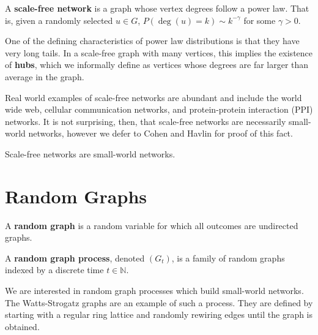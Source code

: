 
\begin{definition}
  A \textbf{scale-free network} is a graph whose vertex degrees follow a power
  law. That is, given a randomly selected $u \in G$,
  $P(\deg(u) = k) \sim k^{-\gamma}$ for some $\gamma > 0$.
\end{definition}

One of the defining characteristics of power law distributions is that they have
very long tails. In a scale-free graph with many vertices, this implies the
existence of \label{def:hubs} \textbf{hubs}, which we informally define as vertices whose degrees
are far larger than average in the graph.

Real world examples of scale-free networks are abundant and include the world
wide web, cellular communication networks, and protein-protein interaction (PPI)
networks. It is not surprising, then, that scale-free networks are necessarily
small-world networks, however we defer to Cohen and Havlin for proof of this
fact.

\begin{theorem}
  Scale-free networks are small-world networks.
\end{theorem}



\section{Random Graphs}
\label{sec:random_graphs}


\begin{definition}
  A \textbf{random graph} is a random variable for which all outcomes are
  undirected graphs.

  A \textbf{random graph process}, denoted $(G_t)$, is a family of random graphs
  indexed by a discrete time $t \in \mathbb{N}$.
\end{definition}

We are interested in random graph processes which build small-world networks.
The Watts-Strogatz graphs are an example of such a process. They are defined by
starting with a regular ring lattice and randomly rewiring edges until the graph
is obtained.

